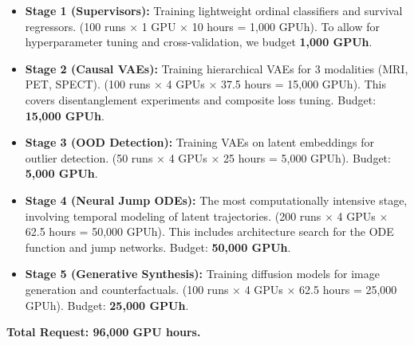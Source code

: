 \documentclass[new,showhints]{nhrproposal}
\begin{document}
\begin{itemize}
    \item \textbf{Stage 1 (Supervisors):} Training lightweight ordinal classifiers and survival regressors.
    (100 runs $\times$ 1 GPU $\times$ 10 hours = 1,000 GPUh). To allow for hyperparameter tuning and cross-validation, we budget \textbf{1,000 GPUh}.

    \item \textbf{Stage 2 (Causal VAEs):} Training hierarchical VAEs for 3 modalities (MRI, PET, SPECT).
    (100 runs $\times$ 4 GPUs $\times$ 37.5 hours = 15,000 GPUh). This covers disentanglement experiments and composite loss tuning. Budget: \textbf{15,000 GPUh}.

    \item \textbf{Stage 3 (OOD Detection):} Training VAEs on latent embeddings for outlier detection.
    (50 runs $\times$ 4 GPUs $\times$ 25 hours = 5,000 GPUh). Budget: \textbf{5,000 GPUh}.

    \item \textbf{Stage 4 (Neural Jump ODEs):} The most computationally intensive stage, involving temporal modeling of latent trajectories.
    (200 runs $\times$ 4 GPUs $\times$ 62.5 hours = 50,000 GPUh). This includes architecture search for the ODE function and jump networks. Budget: \textbf{50,000 GPUh}.

    \item \textbf{Stage 5 (Generative Synthesis):} Training diffusion models for image generation and counterfactuals.
    (100 runs $\times$ 4 GPUs $\times$ 62.5 hours = 25,000 GPUh). Budget: \textbf{25,000 GPUh}.
\end{itemize}
\textbf{Total Request: 96,000 GPU hours.}


\end{document}
